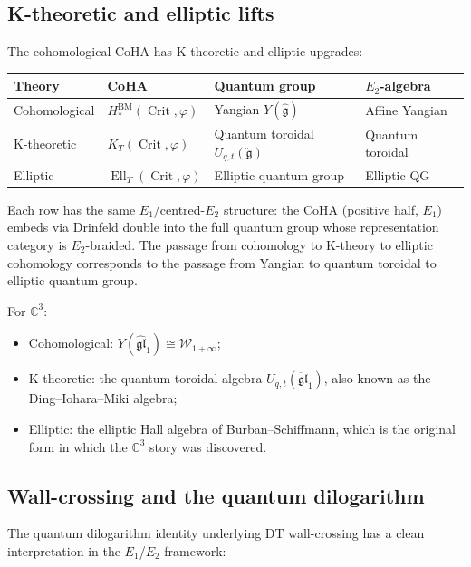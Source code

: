 \documentclass[11pt]{article}
\theoremstyle{definition}
\theoremstyle{remark}
\newcommand{\CC}{\mathbb{C}}
\newcommand{\Crit}{\operatorname{Crit}}
\newcommand{\cW}{\mathcal{W}}
\newcommand{\frakg}{\mathfrak{g}}
\newcommand{\BM}{\operatorname{BM}}
\newcommand{\gl}{\mathfrak{gl}}
\begin{document}
\subsection{K-theoretic and elliptic lifts}
\label{subsec:k-theoretic}

The cohomological CoHA has K-theoretic and elliptic upgrades:

\begin{center}
\renewcommand{\arraystretch}{1.4}
\begin{tabular}{llll}
 \textbf{Theory} & \textbf{CoHA} & \textbf{Quantum group} & \textbf{$E_2$-algebra} \\
 \hline
 Cohomological & $H^{\BM}_*(\Crit, \varphi)$ & Yangian $Y(\widehat{\frakg})$ & Affine Yangian \\
 K-theoretic & $K_T(\Crit, \varphi)$ & Quantum toroidal $U_{q,t}(\ddot{\frakg})$ & Quantum toroidal \\
 Elliptic & $\operatorname{Ell}_T(\Crit, \varphi)$ & Elliptic quantum group & Elliptic QG \\
\end{tabular}
\end{center}

\noindent
Each row has the same $E_1$/centred-$E_2$ structure: the CoHA
(positive half, $E_1$) embeds via Drinfeld double into the full quantum
group whose representation category is $E_2$-braided. The passage
from cohomology to K-theory to elliptic cohomology corresponds to the passage
from Yangian to quantum toroidal to elliptic quantum group.

For $\CC^3$:
\begin{itemize}
 \item Cohomological: $Y(\widehat{\gl}_1) \cong \cW_{1+\infty}$;
 \item K-theoretic: the quantum toroidal algebra $U_{q,t}(\ddot{\gl}_1)$,
 also known as the Ding--Iohara--Miki algebra;
 \item Elliptic: the elliptic Hall algebra of Burban--Schiffmann, which is
 the original form in which the $\CC^3$ story was discovered.
\end{itemize}


\subsection{Wall-crossing and the quantum dilogarithm}
\label{subsec:wall-crossing}

The quantum dilogarithm identity underlying DT wall-crossing has a clean
interpretation in the $E_1$/$E_2$ framework:
\end{document}
